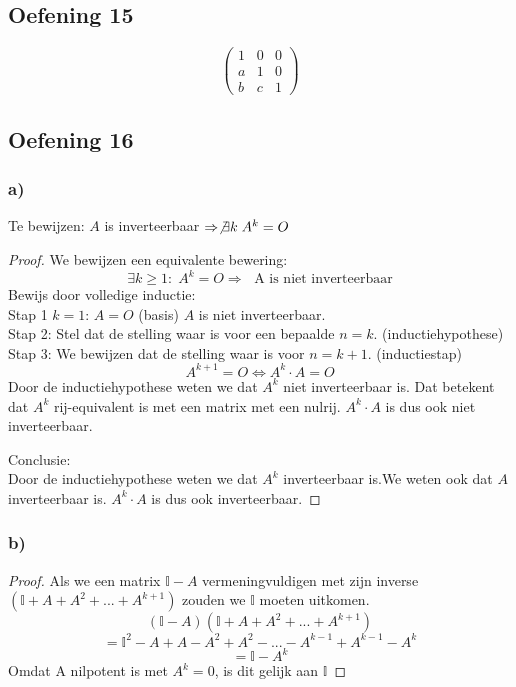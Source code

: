 \documentclass[lineaire_algebra_oplossingen.tex]{subfiles}
\begin{document}
\subsection{Oefening 15}
\[
\begin{pmatrix}
1 & 0 & 0\\
a & 1 & 0\\
b & c & 1
\end{pmatrix}
\]

\subsection{Oefening 16}
\subsubsection*{a)}
Te bewijzen: $A$ is inverteerbaar $\Rightarrow \not \exists k\; A^k=O$ 
\begin{proof}
We bewijzen een equivalente bewering:
\[
\exists k\ge 1:\;A^k=O \Rightarrow\; \text{ A is niet inverteerbaar}
\]
Bewijs door volledige inductie:\\
Stap 1 $k=1$: $A=O$ (basis)
$A$ is niet inverteerbaar.\\
Stap 2: Stel dat de stelling waar is voor een bepaalde $n=k$. (inductiehypothese)\\

Stap 3: We bewijzen dat de stelling waar is voor $n=k+1$. (inductiestap)\\
\[ A^{k+1}=O \Leftrightarrow A^{k}\cdot A=O \]
Door de inductiehypothese weten we dat $A^{k}$ niet inverteerbaar is. Dat betekent dat $A^{k}$ rij-equivalent is met een matrix met een nulrij. $A^{k} \cdot A$ is dus ook niet inverteerbaar.

Conclusie:\\
Door de inductiehypothese weten we dat $A^{k}$ inverteerbaar is.We weten ook dat $A$ inverteerbaar is. $A^{k} \cdot A$ is dus ook inverteerbaar.

\end{proof}

\subsubsection*{b)}
\begin{proof}
Als we een matrix $\mathbb{I}-A$ vermeningvuldigen met zijn inverse $(\mathbb{I}+A+A^2+...+A^{k+1})$ zouden we $\mathbb{I}$ moeten uitkomen.
\[ (\mathbb{I}-A)(\mathbb{I}+A+A^2+...+A^{k+1}) \]
\[ = \mathbb{I}^{2} -A+A-A^{2}+A^{2}-...-A^{k-1}+A^{k-1}-A^{k}\]
\[ = \mathbb{I}-A^{k}\]
Omdat A nilpotent is met $A^k=0$, is dit gelijk aan $\mathbb{I}$
\end{proof}
\end{document}
